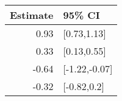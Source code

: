 \begin{tabular}{rl}
  \hline
Estimate & 95\% CI \\ 
  \hline
0.93 & [0.73,1.13] \\ 
  0.33 & [0.13,0.55] \\ 
  -0.64 & [-1.22,-0.07] \\ 
  -0.32 & [-0.82,0.2] \\ 
   \hline
\end{tabular}

